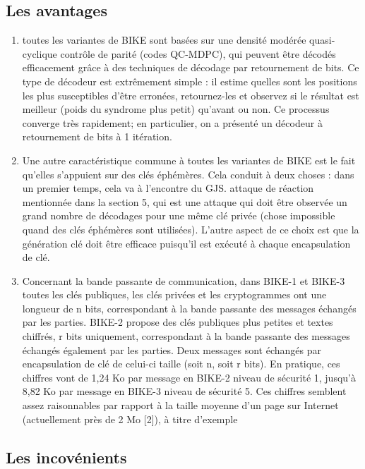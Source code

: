 \documentclass[12pt,openany]{report}
\begin{document}
\subsection{Les avantages}
\begin{enumerate}
\item  toutes les variantes de BIKE sont basées sur une densité modérée quasi-cyclique
contrôle de parité (codes QC-MDPC), qui peuvent être décodés efficacement grâce à des techniques de décodage par retournement de bits. Ce type de décodeur est extrêmement simple : il estime
quelles sont les positions les plus susceptibles d'être erronées, retournez-les et observez si le résultat est meilleur (poids du syndrome plus petit) qu'avant ou non. Ce processus converge
très rapidement; en particulier, on a présenté un décodeur à retournement de bits à 1 itération.
\item Une autre caractéristique commune à toutes les variantes de BIKE est le fait qu'elles s'appuient 
sur des clés éphémères. Cela conduit à deux choses : dans un premier temps, cela va à l’encontre du GJS.
attaque de réaction mentionnée dans la section 5, qui est une attaque qui doit être observée
un grand nombre de décodages pour une même clé privée (chose impossible quand
des clés éphémères sont utilisées). L'autre aspect de ce choix est que la génération clé
doit être efficace puisqu’il est exécuté à chaque encapsulation de clé.

\item Concernant la bande passante de communication, dans BIKE-1 et BIKE-3 toutes les clés publiques,
les clés privées et les cryptogrammes ont une longueur de n bits, correspondant à la bande passante
des messages échangés par les parties. BIKE-2 propose des clés publiques plus petites et
textes chiffrés, r bits uniquement, correspondant à la bande passante des messages échangés
également par les parties. Deux messages sont échangés par encapsulation de clé de celui-ci
taille (soit n, soit r bits). En pratique, ces chiffres vont de 1,24 Ko par message
en BIKE-2 niveau de sécurité 1, jusqu'à 8,82 Ko par message en BIKE-3 niveau de sécurité 5.
Ces chiffres semblent assez raisonnables par rapport à la taille moyenne d'un
page sur Internet (actuellement près de 2 Mo [2]), à titre d'exemple 
\end{enumerate}
 


\subsection{Les incovénients}
\end{document}
